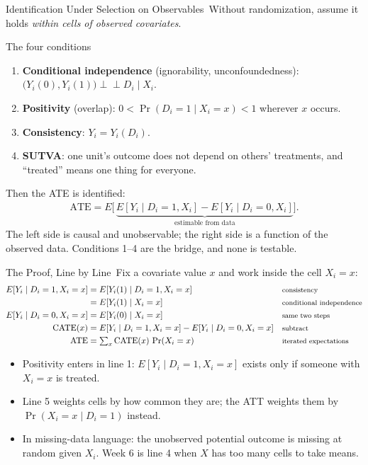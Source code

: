 \documentclass[aspectratio=169,11pt,xcolor=dvipsnames]{beamer}
\newcommand{\indep}{\perp\!\!\!\perp}
\newcommand{\E}{E}
\newcommand{\core}{\,\raisebox{0.6pt}{\textcolor{corestar}{$\bigstar$}}}
\begin{document}
\begin{frame}{Identification Under Selection on Observables\core}
Without randomization, assume it holds \emph{within cells of observed
covariates}.
\begin{block}{The four conditions}
\begin{enumerate}\itemsep0pt
  \item \textbf{Conditional independence} (ignorability, unconfoundedness):
        $\big(Y_i(0),Y_i(1)\big) \indep D_i \mid X_i$.
  \item \textbf{Positivity} (overlap): $0 < \Pr(D_i = 1\mid X_i = x) < 1$
        wherever $x$ occurs.
  \item \textbf{Consistency}: $Y_i = Y_i(D_i)$.
  \item \textbf{SUTVA}: one unit's outcome does not depend on others'
        treatments, and ``treated'' means one thing for everyone.
\end{enumerate}
\end{block}
Then the ATE is identified:
\begin{align*}
  \text{ATE} = \E\Big[\, \underbrace{\E[Y_i\mid D_i=1, X_i] - \E[Y_i\mid D_i=0, X_i]}_{\text{estimable from data}} \Big] .
\end{align*}
The left side is causal and unobservable; the right side is a function of the
observed data. Conditions 1--4 are the bridge, and \alert{none is testable}.
\end{frame}

\begin{frame}{The Proof, Line by Line\core}
Fix a covariate value $x$ and work inside the cell $X_i = x$:
{\footnotesize
\begin{align*}
  \E[Y_i \mid D_i = 1, X_i = x] &= \E[Y_i(1) \mid D_i = 1, X_i = x]
      && \text{\footnotesize consistency} \\
  &= \E[Y_i(1) \mid X_i = x]
      && \text{\footnotesize conditional independence} \\
  \E[Y_i \mid D_i = 0, X_i = x] &= \E[Y_i(0) \mid X_i = x]
      && \text{\footnotesize same two steps} \\
  \text{CATE}(x) &= \E[Y_i \mid D_i = 1, X_i = x] - \E[Y_i \mid D_i = 0, X_i = x]
      && \text{\footnotesize subtract} \\
  \text{ATE} &= \textstyle\sum_x \text{CATE}(x)\,\Pr(X_i = x)
      && \text{\footnotesize iterated expectations}
\end{align*}}
\begin{itemize}\itemsep3pt
  \item Positivity enters in line 1: $\E[Y_i \mid D_i = 1, X_i = x]$ exists
        only if someone with $X_i = x$ is treated.
  \item Line 5 weights cells by how common they are; the ATT weights them by
        $\Pr(X_i = x \mid D_i = 1)$ instead.
  \item In missing-data language: the unobserved potential outcome is
        missing at random given $X_i$. Week 6 is line 4 when $X$ has too
        many cells to take means.
\end{itemize}
\end{frame}
\end{document}
